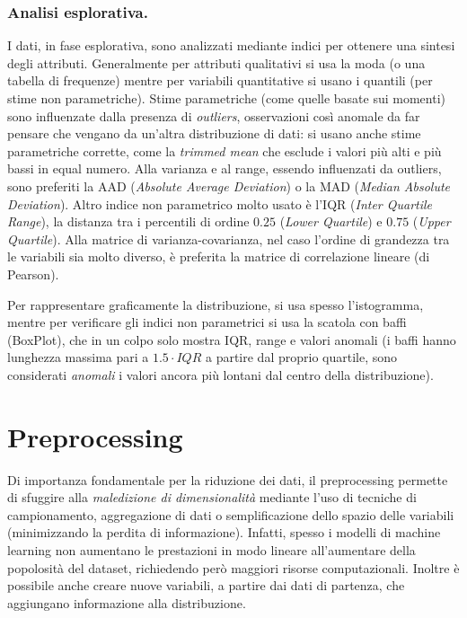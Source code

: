 \documentclass[11pt, a4page, twocolumn]{article}
\begin{document}
\section{Analisi esplorativa.}
I dati, in fase esplorativa, sono analizzati mediante indici per ottenere una sintesi degli attributi.
Generalmente per attributi qualitativi si usa la moda (o una tabella di frequenze) mentre per variabili quantitative si usano i quantili (per stime non parametriche).
Stime parametriche (come quelle basate sui momenti) sono influenzate dalla presenza di \textit{outliers}, osservazioni così anomale da far pensare che vengano da un'altra distribuzione di dati: si usano anche stime parametriche corrette, come la \textit{trimmed mean} che esclude i valori più alti e più bassi in equal numero.
Alla varianza e al range, essendo influenzati da outliers, sono preferiti la AAD (\textit{Absolute Average Deviation}) o la MAD (\textit{Median Absolute Deviation}).
Altro indice non parametrico molto usato è l'IQR (\textit{Inter Quartile Range}), la distanza tra i percentili di ordine $0.25$ (\textit{Lower Quartile}) e $0.75$ (\textit{Upper Quartile}).
Alla matrice di varianza-covarianza, nel caso l'ordine di grandezza tra le variabili sia molto diverso, è preferita la matrice di correlazione lineare (di Pearson). \newline

Per rappresentare graficamente la distribuzione, si usa spesso l'istogramma, mentre per verificare gli indici non parametrici si usa la scatola con baffi (BoxPlot), che in un colpo solo mostra IQR, range e valori anomali (i baffi hanno lunghezza massima pari a $1.5 \cdot IQR$ a partire dal proprio quartile, sono considerati \textit{anomali} i valori ancora più lontani dal centro della distribuzione).



\newpage
\part{Preprocessing}
Di importanza fondamentale per la riduzione dei dati, il preprocessing permette di sfuggire alla \textit{maledizione di dimensionalità} mediante l'uso di tecniche di campionamento, aggregazione di dati o semplificazione dello spazio delle variabili (minimizzando la perdita di informazione).
Infatti, spesso i modelli di machine learning non aumentano le prestazioni in modo lineare all'aumentare della popolosità del dataset, richiedendo però maggiori risorse computazionali.
Inoltre è possibile anche creare nuove variabili, a partire dai dati di partenza, che aggiungano informazione alla distribuzione.
\end{document}
